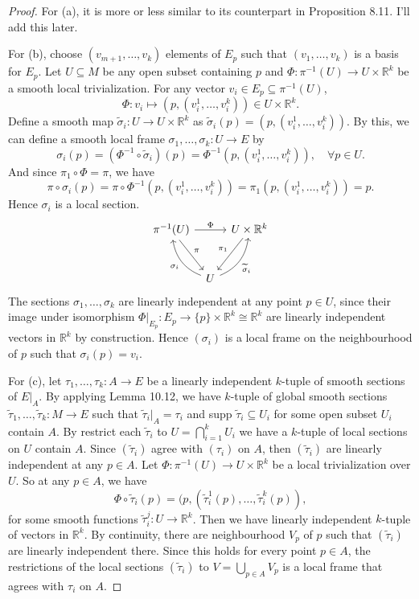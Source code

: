 \documentclass[a4paper]{article}
\theoremstyle{remark}
\newcommand{\rk}{\mathbb{R}^k} %
\newcommand{\subhim}{\subseteq} %
\newcommand{\isomorphic}{\cong} %
\begin{document}
\begin{proof}
For (a), it is more or less similar to its counterpart in Proposition 8.11. I'll add this later.

For (b), choose $(v_{m+1},\dots ,v_k)$ elements of $E_p$ such that $(v_1,\dots,v_k)$ is a basis for $E_p$.  Let $U\subhim M$ be any open subset containing $p$ and $\Phi : \pi^{-1}(U) \to U \times \rk$ be a smooth local trivialization. For any vector $v_i \in E_p \subhim \pi^{-1}(U)$, 
$$
\Phi : v_i \mapsto (p,(v^1_i,\dots,v^k_i)) \in U \times \rk.
$$
Define a smooth map $\widetilde{\sigma}_i : U \to U\times \rk$ as $\widetilde{\sigma}_i (p) = (p,(v_i^1 ,\dots , v_i^k))$. By this, we can define a smooth local frame $\sigma_1,\dots,\sigma_k : U \to E$ by
$$
\sigma_i (p) = (\Phi^{-1} \circ \widetilde{\sigma}_i) (p)= \Phi^{-1} (p,(v^1_i,\dots,v^k_i)) ,\quad \forall p\in U. 
$$
And since $\pi_1 \circ \Phi = \pi$, we have 
$$
\pi \circ \sigma_i (p) = \pi \circ \Phi^{-1}  (p,(v^1_i,\dots,v^k_i)) = \pi_1 (p,(v^1_i,\dots,v^k_i)) = p.
$$
Hence $\sigma_i$ is a local section.
\[
\begin{tikzcd}[row sep=large,column sep=tiny]
\pi^{-1}(U) \ar[rr,"\Phi"] \ar[dr,"\pi"] & & U \times \rk \ar[dl,swap,"\pi_1"] \\
& U \ar[ul, bend left=30, "\sigma_i"] \ar[ur, bend right=30, swap, "\widetilde{\sigma}_i"] & 
\end{tikzcd}
\] 
The sections $\sigma_1,\dots,\sigma_k$ are linearly independent at any point $p \in U$, since their image under isomorphism $\Phi|_{E_p} : E_p \to \{p\} \times \rk \isomorphic \rk$ are linearly independent vectors in $\rk$ by construction. Hence $(\sigma_i)$ is a local frame on the neighbourhood of $p$ such that $\sigma_i(p) = v_i$.

For (c), let $\tau_1,\dots,\tau_k : A \to E$ be a linearly independent $k$-tuple of smooth sections of $E|_A$. By applying Lemma 10.12, we have $k$-tuple of global smooth sections $\widetilde{\tau}_1,\dots,\widetilde{\tau}_k : M \to E$ such that $\widetilde{\tau}_i|_A = \tau_i$ and supp $\widetilde{\tau}_i \subhim U_i$ for some open subset $U_i$ contain $A$. By restrict each $\widetilde{\tau}_i$ to $U= \bigcap_{i=1}^k U_i$ we have a $k$-tuple of local sections on $U$ contain $A$. Since $(\widetilde{\tau}_i)$ agree with $(\tau_i)$ on $A$, then $(\widetilde{\tau}_i)$ are linearly independent at any $p \in A$. Let $\Phi : \pi^{-1}(U) \to U \times \rk$ be a local trivialization over $U$. So at any $p\in A$, we have
$$
\Phi \circ \widetilde{\tau}_i (p) = (p, (\widetilde{\tau}_i^1(p),\dots,\widetilde{\tau}_i^k(p)),
$$ 
for some smooth functions $\widetilde{\tau}_i^j : U \to \rk$. Then we have linearly independent $k$-tuple of vectors in $\rk$. By continuity, there are neighbourhood $V_p$ of $p$ such that $(\widetilde{\tau}_i)$ are linearly independent there. Since this holds for every point $p \in A$, the restrictions of the local sections $(\widetilde{\tau}_i)$ to $V = \bigcup_{p \in A} V_p$ is a local frame that agrees with $\tau_i$ on $A$. 
\end{proof}
\end{document}
